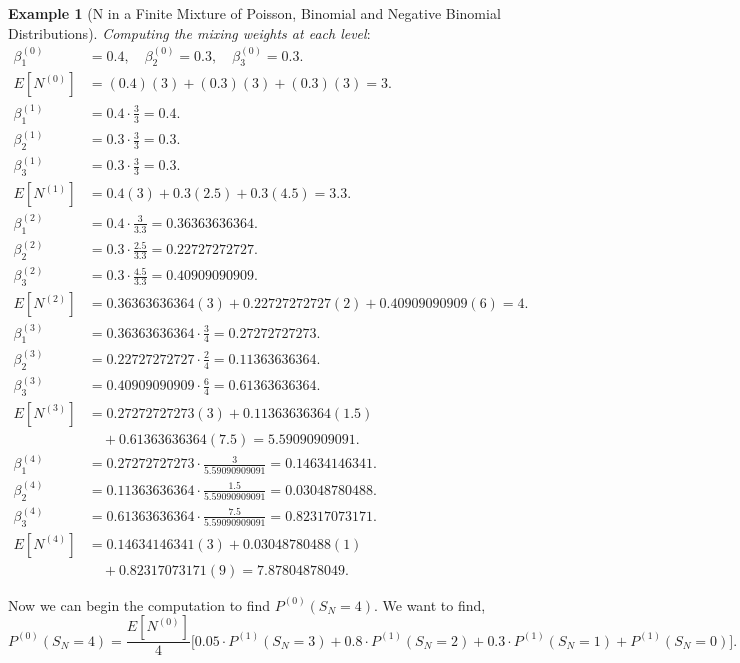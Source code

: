 \documentclass[11pt]{amsart}
\theoremstyle{definition}
\newtheorem{example}{Example}
\theoremstyle{plain}
\begin{document}
\begin{example}[N in a Finite Mixture of Poisson, Binomial and Negative Binomial
Distributions]
\noindent\textit{Computing the mixing weights at each level}:
\begin{align*}
\beta_1^{(0)} &= 0.4, \quad \beta_2^{(0)} = 0.3, \quad \beta_3^{(0)} = 0.3. \\
E[N^{(0)}]
    &= (0.4)(3) + (0.3)(3) + (0.3)(3) = 3. \\
\beta_1^{(1)} &= 0.4 \cdot \frac{3}{3} = 0.4. \\
\beta_2^{(1)} &= 0.3 \cdot \frac{3}{3} = 0.3. \\
\beta_3^{(1)} &= 0.3 \cdot \frac{3}{3} = 0.3. \\
E[N^{(1)}]
    &= 0.4(3) + 0.3(2.5) + 0.3(4.5) = 3.3. \\
\beta_1^{(2)} &= 0.4 \cdot \frac{3}{3.3} = 0.36363636364. \\
\beta_2^{(2)} &= 0.3 \cdot \frac{2.5}{3.3} = 0.22727272727. \\
\beta_3^{(2)} &= 0.3 \cdot \frac{4.5}{3.3} = 0.40909090909. \\
E[N^{(2)}]
    &= 0.36363636364(3) + 0.22727272727(2) + 0.40909090909(6) = 4. \\
\beta_1^{(3)} &= 0.36363636364 \cdot \frac{3}{4} = 0.27272727273. \\
\beta_2^{(3)} &= 0.22727272727 \cdot \frac{2}{4} = 0.11363636364. \\
\beta_3^{(3)} &= 0.40909090909 \cdot \frac{6}{4} = 0.61363636364. \\
E[N^{(3)}]
    &= 0.27272727273(3) + 0.11363636364(1.5) \\
    &\quad + 0.61363636364(7.5) = 5.59090909091. \\
\beta_1^{(4)} &= 0.27272727273 \cdot \frac{3}{5.59090909091} = 0.14634146341. \\
\beta_2^{(4)} &= 0.11363636364 \cdot \frac{1.5}{5.59090909091} = 0.03048780488. \\
\beta_3^{(4)} &= 0.61363636364 \cdot
    \frac{7.5}{5.59090909091} = 0.82317073171. \\
E[N^{(4)}]
    &= 0.14634146341(3) + 0.03048780488(1) \\
    &\quad + 0.82317073171(9) = 7.87804878049.
\end{align*}

Now we can begin the computation to find $P^{(0)}(S_N = 4)$.  We want to find,
\[
    P^{(0)}(S_N = 4)
    = \frac{E[N^{(0)}]}{4}
      \bigl[0.05 \cdot P^{(1)}(S_N = 3) + 0.8 \cdot P^{(1)}(S_N = 2)
      + 0.3 \cdot P^{(1)}(S_N = 1) + P^{(1)}(S_N = 0)\bigr].
\]


\end{example}
\end{document}
